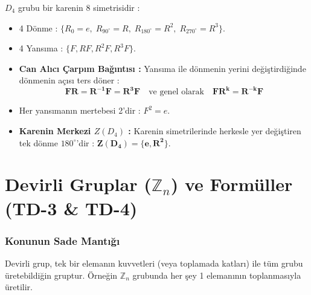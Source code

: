 \documentclass[11pt,a4paper]{article}
\begin{document}
\begin{tcolorbox}[colback=yellow!5!white,colframe=orange!80!black,title=Dihedral Grup $D_4$ (Karenin Simetrileri - $|D_4| = 8$)]
$D_4$ grubu bir karenin 8 simetrisidir :
\begin{itemize}
    \item 4 Dönme : $\{R_0 = e, \; R_{90^\circ} = R, \; R_{180^\circ} = R^2, \; R_{270^\circ} = R^3\}$.
    \item 4 Yansıma : $\{F, RF, R^2F, R^3F\}$.
    \item \textbf{Can Alıcı Çarpım Bağıntısı :} Yansıma ile dönmenin yerini değiştirdiğinde dönmenin açısı ters döner :
    \[ \mathbf{FR = R^{-1}F = R^3F} \quad \text{ve genel olarak} \quad \mathbf{FR^k = R^{-k}F} \]
    \item Her yansımanın mertebesi 2'dir : $F^2 = e$.
    \item \textbf{Karenin Merkezi $Z(D_4)$ :} Karenin simetrilerinde herkesle yer değiştiren tek dönme $180^\circ$'dir : $\mathbf{Z(D_4) = \{e, R^2\}}$.
\end{itemize}
\end{tcolorbox}

\vspace{0.5cm}

\section{Devirli Gruplar ($\mathbb{Z}_n$) ve Formüller (TD-3 \& TD-4)}

\subsubsection*{Konunun Sade Mantığı}
Devirli grup, tek bir elemanın kuvvetleri (veya toplamada katları) ile tüm grubu üretebildiğin gruptur. Örneğin $\mathbb{Z}_n$ grubunda her şey 1 elemanının toplanmasıyla üretilir.
\end{document}

